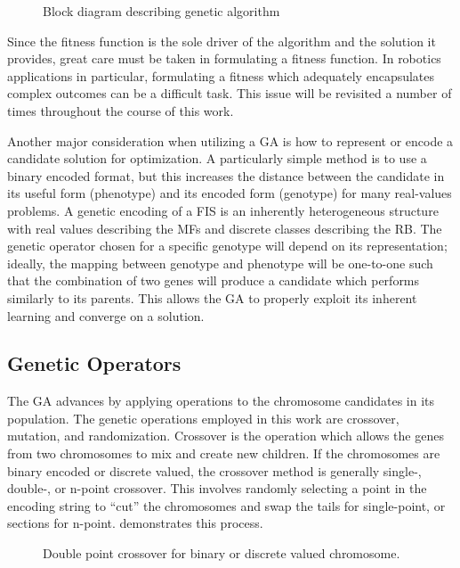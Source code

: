 \begin{figure}[ht]
    \centering
    
    \caption{Block diagram describing genetic algorithm}\label{f:ga_block}
\end{figure}

Since the fitness function is the sole driver of the algorithm and the solution it provides, great care must
be taken in formulating a fitness function. In robotics applications in particular, formulating a fitness
which adequately encapsulates complex outcomes can be a difficult task\cite{divband2015effect}. This issue
will be revisited a number of times throughout the course of this work.

Another major consideration when utilizing a GA is how to represent or encode a candidate solution for
optimization. A particularly simple method is to use a binary encoded format\cite{cordon:01bk}, but this
increases the distance between the candidate in its useful form (phenotype) and its encoded form (genotype)
for many real-values problems\cite{chakraborty1991chromosomal}. A genetic encoding of a FIS is an inherently
heterogeneous structure with real values describing the MFs and discrete classes describing the RB. The
genetic operator chosen for a specific genotype will depend on its representation; ideally, the mapping
between genotype and phenotype will be one-to-one such that the combination of two genes will produce a
candidate which performs similarly to its parents. This allows the GA to properly exploit its inherent
learning and converge on a solution.

\subsection{Genetic Operators}
The GA advances by applying operations to the chromosome candidates in its population. The genetic operations
employed in this work are crossover,  mutation, and randomization. Crossover is the operation which allows the
genes from two chromosomes to mix and create new children. If the chromosomes are binary encoded or discrete
valued, the crossover method is generally single-, double-, or n-point crossover. This involves randomly
selecting a point in the encoding string to ``cut'' the chromosomes and swap the tails for single-point, or
sections for n-point.   demonstrates this process. 



\begin{figure}[ht]
    \centering
    
    \caption{Double point crossover for binary or discrete valued chromosome.}\label{f:dp_cx}
\end{figure}

